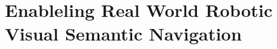 \chapter{Enableling Real World Robotic Visual Semantic Navigation}\label{ch:ros4vsn:-enable-real-world-robotic-visual-semantic-navigation}


